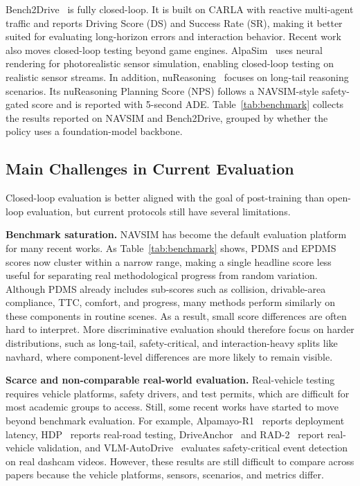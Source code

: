 \documentclass[runningheads]{llncs}
\begin{document}
Bench2Drive~\cite{bench2drive2024} is fully closed-loop. It is built on CARLA with reactive multi-agent traffic and reports Driving Score (DS) and Success Rate (SR), making it better suited for evaluating long-horizon errors and interaction behavior. Recent work also moves closed-loop testing beyond game engines. AlpaSim~\cite{alpasim2025} uses neural rendering for photorealistic sensor simulation, enabling closed-loop testing on realistic sensor streams. In addition, nuReasoning~\cite{nureasoning2026} focuses on long-tail reasoning scenarios. Its nuReasoning Planning Score (NPS) follows a NAVSIM-style safety-gated score and is reported with 5-second ADE. Table~\ref{tab:benchmark} collects the results reported on NAVSIM and Bench2Drive, grouped by whether the policy uses a foundation-model backbone.


\vspace{-0.5cm}

\subsection{Main Challenges in Current Evaluation}
\label{sec:eval:challenges}

Closed-loop evaluation is better aligned with the goal of post-training than open-loop evaluation, but current protocols still have several limitations.

\textbf{Benchmark saturation.} NAVSIM has become the default evaluation platform for many recent works. As Table~\ref{tab:benchmark} shows, PDMS and EPDMS scores now cluster within a narrow range, making a single headline score less useful for separating real methodological progress from random variation. Although PDMS already includes sub-scores such as collision, drivable-area compliance, TTC, comfort, and progress, many methods perform similarly on these components in routine scenes. As a result, small score differences are often hard to interpret. More discriminative evaluation should therefore focus on harder distributions, such as long-tail, safety-critical, and interaction-heavy splits like navhard, where component-level differences are more likely to remain visible.

\textbf{Scarce and non-comparable real-world evaluation.} Real-vehicle testing requires vehicle platforms, safety drivers, and test permits, which are difficult for most academic groups to access. Still, some recent works have started to move beyond benchmark evaluation. For example, Alpamayo-R1~\cite{alpamayo2025} reports deployment latency, HDP~\cite{hdp2026} reports real-road testing, DriveAnchor~\cite{driveanchor2026} and RAD-2~\cite{rad2_2026} report real-vehicle validation, and VLM-AutoDrive~\cite{vlmautodrive2026} evaluates safety-critical event detection on real dashcam videos. However, these results are still difficult to compare across papers because the vehicle platforms, sensors, scenarios, and metrics differ. 
\end{document}
